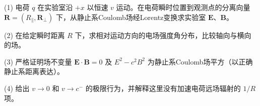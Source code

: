 (1) 电荷 \(q\) 在实验室沿 \(+x\) 以恒速 \(v\) 运动。在电荷瞬时位置到观测点的分离向量 \(\mathbf R=(R_\parallel,\mathbf R_\perp)\) 下，从静止系Coulomb场经Lorentz变换求实验室 \(\mathbf E\)、\(\mathbf B\)。

(2) 在给定瞬时距离 \(R\) 下，求相对运动方向的电场强度角分布，比较轴向与横向的场。

(3) 严格证明场不变量 \(\mathbf E\cdot\mathbf B=0\) 及 \(E^2-c^2B^2\) 为静止系Coulomb场平方（以正确静止系距离表达）。

(4) 给出 \(v\to0\) 和 \(v\to c^-\) 的极限行为，并解释这里没有加速电荷远场辐射的 \(1/R\) 项。
